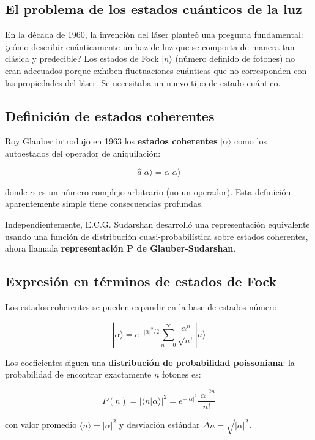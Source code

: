 \documentclass[11pt,a4paper,spanish]{book}
\begin{document}
\subsection*{El problema de los estados cuánticos de la luz}

En la década de 1960, la invención del láser planteó una pregunta fundamental: ¿cómo describir cuánticamente un haz de luz que se comporta de manera tan clásica y predecible? Los estados de Fock $|n\rangle$ (número definido de fotones) no eran adecuados porque exhiben fluctuaciones cuánticas que no corresponden con las propiedades del láser. Se necesitaba un nuevo tipo de estado cuántico.

\subsection*{Definición de estados coherentes}

Roy Glauber introdujo en 1963 \citep{glauber1963a, glauber1963b} los \textbf{estados coherentes} $|\alpha\rangle$ como los autoestados del operador de aniquilación:

\[
\hat{a}|\alpha\rangle = \alpha|\alpha\rangle
\]

donde $\alpha$ es un número complejo arbitrario (no un operador). Esta definición aparentemente simple tiene consecuencias profundas.

Independientemente, E.C.G. Sudarshan \citep{sudarshan1963} desarrolló una representación equivalente usando una función de distribución cuasi-probabilística sobre estados coherentes, ahora llamada \textbf{representación P de Glauber-Sudarshan}.

\subsection*{Expresión en términos de estados de Fock}

Los estados coherentes se pueden expandir en la base de estados número:

\[
|\alpha\rangle = e^{-|\alpha|^2/2} \sum_{n=0}^{\infty} \frac{\alpha^n}{\sqrt{n!}}|n\rangle
\]

Los coeficientes siguen una \textbf{distribución de probabilidad poissoniana}: la probabilidad de encontrar exactamente $n$ fotones es:

\[
P(n) = |\langle n|\alpha\rangle|^2 = e^{-|\alpha|^2} \frac{|\alpha|^{2n}}{n!}
\]

con valor promedio $\langle n \rangle = |\alpha|^2$ y desviación estándar $\Delta n = \sqrt{|\alpha|^2}$.
\end{document}
